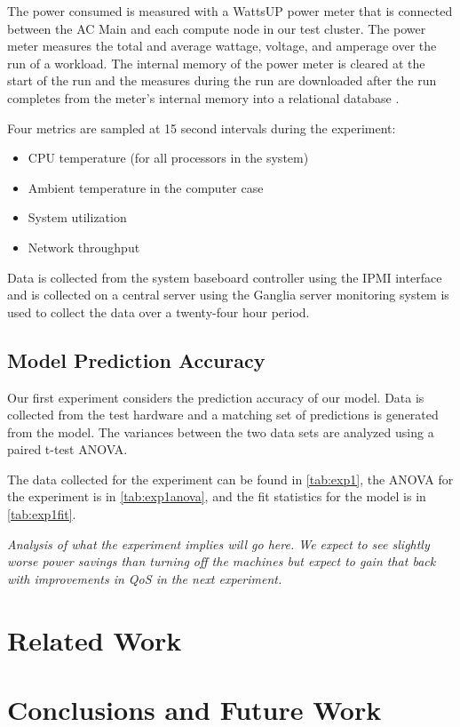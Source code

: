 \documentclass[times, 10pt,onecolumn]{article}
\begin{document}
The power consumed is measured with a WattsUP \cite{WattsUp2006a} power meter
that is connected between the AC Main and each compute node in our test
cluster.  The power meter measures the total and average wattage, voltage, and
amperage over the run of a workload.  The internal memory of the power meter
is cleared at the start of the run and the measures during the run are
downloaded after the run completes from the meter's internal memory into a
relational database \cite{WattsUp2006b}.

Four metrics are sampled at 15 second intervals during the experiment:
\begin{itemize}
\item CPU temperature (for all processors in the system)
\item Ambient temperature in the computer case
\item System utilization
\item Network throughput 
\end{itemize}
Data is collected from the system baseboard controller using the IPMI
interface and is collected on a central server using the Ganglia server
monitoring system \cite{Ganglia2003} is used to collect the data over a
twenty-four hour period.

\subsection{Model Prediction Accuracy}
\label{sec:linearreg}
Our first experiment considers the prediction accuracy of our model.
Data is collected from the test hardware and a matching set of
predictions is generated from the model. The variances between the two
data sets are analyzed using a paired t-test ANOVA.

The data collected for the experiment can be found in \ref{tab:exp1},
the ANOVA for the experiment is in \ref{tab:exp1anova}, and the fit
statistics for the model is in \ref{tab:exp1fit}.


\emph{Analysis of what the experiment implies will go here.  We expect to see
  slightly worse power savings than turning off the machines but expect to
  gain that back with improvements in QoS in the next experiment.}

\section{Related Work}
\label{sec:related}

\section{Conclusions and Future Work}
\label{sec:conclusions}
\end{document}
